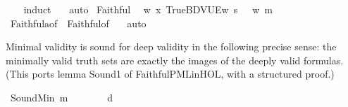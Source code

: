\begin{isabellebody}
%
\isadelimproof
\ \ %
\endisadelimproof
%
\isatagproof
{}\isamarkupfalse%
\ {\isacharparenleft}{\kern0pt}induct\ {\isasymphi}{\isacharparenright}{\kern0pt}\ \isamarkupfalse%
\ auto%
\endisatagproof
{\isafoldproof}%
%
\isadelimproof
\isanewline
%
\endisadelimproof
\isanewline
{}\isamarkupfalse%
\ Faithful{}{\isacharcolon}{\kern0pt}\isanewline
\ \ {\isachardoublequoteopen}{\isasymforall}w{\isachardot}{\kern0pt}\ {\isasymlangle}{\isacharparenleft}{\kern0pt}{\isasymlambda}x{\isacharcolon}{\kern0pt}{\isacharcolon}{\kern0pt}{\isasymw}{\isachardot}{\kern0pt}\ True{\isacharparenright}{\kern0pt}{\isacharcomma}{\kern0pt}BDVUEw\ {\isasymTurnstile}\isactrlsup s\ {\isasymlparr}{\isasymphi}{\isasymrparr}\ {\isasymlongleftrightarrow}\ w\ {\isasymTurnstile}\isactrlsup m\ {\isasymlceil}{\isasymphi}{\isasymrceil}{\isachardoublequoteclose}\isanewline
%
\isadelimproof
\ \ %
\endisadelimproof
%
\isatagproof
{}\isamarkupfalse%
\ Faithful{}a{\isacharbrackleft}{\kern0pt}of\ {\isasymphi}{\isacharbrackright}{\kern0pt}\ Faithful{}{\isacharbrackleft}{\kern0pt}of\ {\isasymphi}{\isacharbrackright}{\kern0pt}\ \isamarkupfalse%
\ auto%
\endisatagproof
{\isafoldproof}%
%
\isadelimproof
%
\endisadelimproof
%
\begin{isamarkuptext}%
Minimal validity is sound for deep validity in the following precise sense:
the minimally valid truth sets are exactly the images of the deeply valid
formulas. (This ports lemma Sound1 of FaithfulPMLinHOL, with a structured proof.)%
\end{isamarkuptext}\isamarkuptrue%
\isamarkupfalse%
\ SoundMin{\isacharcolon}{\kern0pt}\ {\isachardoublequoteopen}{\isacharparenleft}{\kern0pt}{\isasymTurnstile}\isactrlsup m\ {\isasympsi}{\isacharparenright}{\kern0pt}\ {\isasymlongleftrightarrow}\ {\isacharparenleft}{\kern0pt}{\isasymexists}{\isasymphi}{\isachardot}{\kern0pt}\ {\isasympsi}\ {\isacharequal}{\kern0pt}\ {\isasymlceil}{\isasymphi}{\isasymrceil}\ {\isasymand}\ {\isasymTurnstile}\isactrlsup d\ {\isasymphi}{\isacharparenright}{\kern0pt}{\isachardoublequoteclose}\isanewline
%
\isadelimproof
%
\endisadelimproof
%
\isatagproof
{}\isamarkupfalse%
\isanewline
\ \ \isamarkupfalse%

\end{isabellebody}
